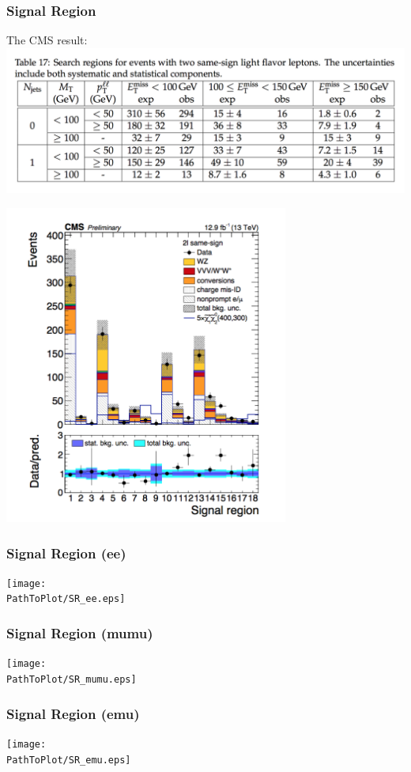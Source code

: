 \documentclass[mathserif,serif]{beamer}
\begin{document}
\begin{frame}
\frametitle{Signal Region}
The CMS result:
\includegraphics[width=1\textwidth]{data/photo/result.png}
\end{frame}

\begin{frame}
\includegraphics[width=0.7\textwidth]{data/photo/BG.png}
\end{frame}

\begin{frame}
\frametitle{Signal Region (ee)}
\texttt{[image: \\PathToPlot/SR\_ee.eps]}
\end{frame}

\begin{frame}
\frametitle{Signal Region (mumu)}
\texttt{[image: \\PathToPlot/SR\_mumu.eps]}
\end{frame}

\begin{frame}
\frametitle{Signal Region (emu)}
\texttt{[image: \\PathToPlot/SR\_emu.eps]}
\end{frame}
\end{document}
